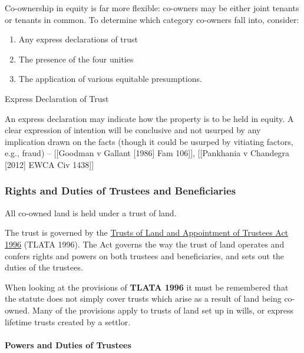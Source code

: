 \documentclass[
]{article}
\providecommand{\tightlist}{%
  \setlength{\itemsep}{0pt}\setlength{\parskip}{0pt}}
\begin{document}
Co-ownership in equity is far more flexible: co-owners may be either
joint tenants or tenants in common. To determine which category
co-owners fall into, consider:

\begin{enumerate}
\def\labelenumi{\arabic{enumi}.}
\tightlist
\item
  Any express declarations of trust
\item
  The presence of the four unities
\item
  The application of various equitable presumptions.
\end{enumerate}

Express Declaration of Trust

An express declaration may indicate how the property is to be held in
equity. A clear expression of intention will be conclusive and not
usurped by any implication drawn on the facts (though it could be
usurped by vitiating factors, e.g., fraud) -- {[}{[}Goodman v Gallant
{[}1986{]} Fam 106{]}{]}, {[}{[}Pankhania v Chandegra {[}2012{]} EWCA
Civ 1438{]}{]}

\hypertarget{rights-and-duties-of-trustees-and-beneficiaries}{%
\subsubsection{Rights and Duties of Trustees and
Beneficiaries}\label{rights-and-duties-of-trustees-and-beneficiaries}}

All co-owned land is held under a trust of land.

The trust is governed by the
\href{https://www.legislation.gov.uk/ukpga/1996/47/contents}{Trusts of
Land and Appointment of Trustees Act 1996} (TLATA 1996). The Act governs
the way the trust of land operates and confers rights and powers on both
trustees and beneficiaries, and sets out the duties of the trustees.

When looking at the provisions of \textbf{TLATA 1996} it must be
remembered that the statute does not simply cover trusts which arise as
a result of land being co-owned. Many of the provisions apply to trusts
of land set up in wills, or express lifetime trusts created by a
settlor.

\hypertarget{powers-and-duties-of-trustees}{%
\paragraph{Powers and Duties of
Trustees}\label{powers-and-duties-of-trustees}}
\end{document}
